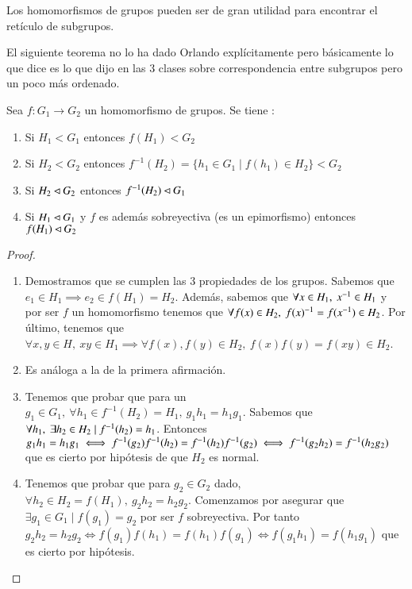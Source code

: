 Los homomorfismos de grupos pueden ser de gran utilidad para encontrar el retículo de subgrupos.

El siguiente teorema no lo ha dado Orlando explícitamente pero básicamente lo que dice es lo que dijo en las 3 clases sobre correspondencia entre subgrupos pero un poco más ordenado.

\begin{thm}
	\label{thm:correspondenciasubgruposdor96}
	Sea $f:G_1 \to G_2$ un homomorfismo de grupos. Se tiene \cite{dor96}:
	\begin{enumerate}
		\item Si $H_1 < G_1$ entonces $f(H_1) < G_2$
		\item Si $H_2 < G_2$ entonces $f^{-1}(H_2) = \{h_1 \in G_1 \mid f(h_1) \in H_2\} < G_2$
		\item Si $H_2 \lhd G_2$ entonces $f^{-1}(H_2) \lhd G_1$
		\item Si $H_1 \lhd G_1$ y $f$ es además sobreyectiva (es un epimorfismo) entonces $f(H_1) \lhd G_2$
	\end{enumerate}
\end{thm}

\begin{proof}$ $\newline
	\begin{enumerate}
		\item Demostramos que se cumplen las 3 propiedades de los grupos. Sabemos que $e_1 \in H_1 \implies e_2 \in f(H_1) = H_2$. Además, sabemos que $\forall x \in H_1,\ \inv{x} \in H_1$ y por ser $f$ un homomorfismo tenemos que $\forall f(x) \in H_2,\ f(x)^{-1} = f(x^{-1}) \in H_2$. Por último, tenemos que $\forall x,y \in H,\ xy \in H_1 \implies \forall f(x),f(y) \in H_2,\ f(x)f(y) = f(xy) \in H_2$.
		\item Es análoga a la de la primera afirmación.
		\item Tenemos que probar que para un $g_1 \in G_1,\ \forall h_1 \in f^{-1}(H_2) = H_1,\ g_1 h_1 = h_1 g_1$. Sabemos que $\forall h_1,\ \exists h_2 \in H_2 \mid f^{-1}(h_2) = h_1$. Entonces $g_1h_1 = h_1 g_1 \iff f^{-1}(g_2)f^{-1}(h_2) = f^{-1}(h_2)f^{-1}(g_2) \iff f^{-1}(g_2h_2) = f^{-1}(h_2g_2)$ que es cierto por hipótesis de que $H_2$ es normal.
		\item Tenemos que probar que para $g_2 \in G_2$ dado, $\forall h_2 \in H_2 = f(H_1),\ g_2h_2 = h_2g_2$. Comenzamos por asegurar que $\exists g_1 \in G_1 \mid f(g_1) = g_2$ por ser $f$ sobreyectiva. Por tanto $g_2h_2 = h_2 g_2 \iff f(g_1)f(h_1) = f(h_1)f(g_1) \iff f(g_1h_1) = f(h_1g_1)$ que es cierto por hipótesis.
	\end{enumerate}
\end{proof}

